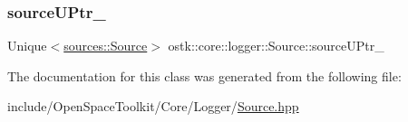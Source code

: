\subsubsection{\texorpdfstring{source\+U\+Ptr\+\_\+}{sourceUPtr\_}}
{\footnotesize\ttfamily Unique$<$\hyperlink{classostk_1_1core_1_1logger_1_1sources_1_1_source}{sources\+::\+Source}$>$ ostk\+::core\+::logger\+::\+Source\+::source\+U\+Ptr\+\_\+}



The documentation for this class was generated from the following file\+:\begin{DoxyCompactItemize}
\item 
include/\+Open\+Space\+Toolkit/\+Core/\+Logger/\hyperlink{_source_8hpp}{Source.\+hpp}\end{DoxyCompactItemize}
